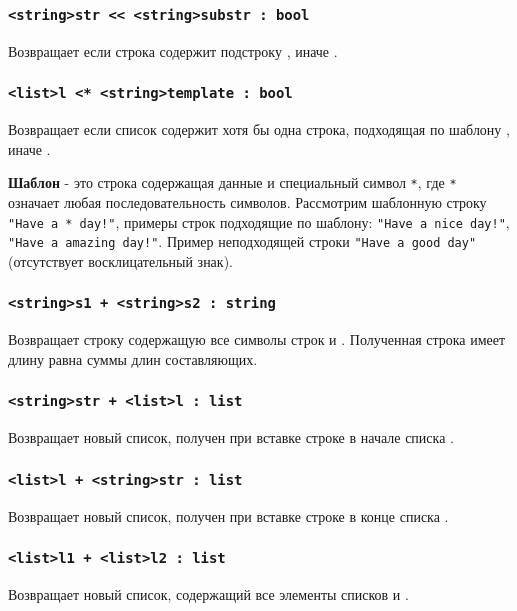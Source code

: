 \documentclass[a4paper, 14pt]{extarticle}
\begin{document}
\subsubsection{\lstinline`<string>str << <string>substr : bool`}
	Возвращает  если строка  содержит подстроку , иначе .

\subsubsection{\lstinline`<list>l <* <string>template : bool`}
	Возвращает  если список  содержит хотя бы одна строка, подходящая по шаблону , иначе .
	
	{\bf Шаблон} - это строка содержащая данные и специальный символ \lstinline`*`, где \lstinline`*` означает любая последовательность символов. Рассмотрим шаблонную строку \lstinline`"Have a * day!"`, примеры строк подходящие по шаблону: \lstinline`"Have a nice day!"`, \lstinline`"Have a amazing day!"`. Пример неподходящей строки \lstinline`"Have a good day"` (отсутствует восклицательный знак).

\subsubsection{\lstinline`<string>s1 + <string>s2 : string`}
	Возвращает строку содержащую все символы строк  и . Полученная строка имеет длину равна суммы длин составляющих.

\subsubsection{\lstinline`<string>str + <list>l : list`}
	Возвращает новый список, получен при вставке строке  в начале списка .

\subsubsection{\lstinline`<list>l + <string>str : list`}
	Возвращает новый список, получен при вставке строке  в конце списка .

\subsubsection{\lstinline`<list>l1 + <list>l2 : list`}
	Возвращает новый список, содержащий все элементы списков  и .
\end{document}
